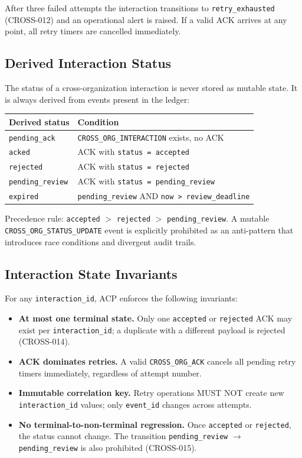 \documentclass[11pt]{article}
\theoremstyle{definition}
\begin{document}
After three failed attempts the interaction transitions to \texttt{retry\_exhausted}
(CROSS-012) and an operational alert is raised.
If a valid ACK arrives at any point, all retry timers are cancelled immediately.

\subsection{Derived Interaction Status}

The status of a cross-organization interaction is never stored as mutable state.
It is always derived from events present in the ledger:

\begin{center}
\begin{tabular}{@{}ll@{}}
\toprule
\textbf{Derived status} & \textbf{Condition} \\
\midrule
\texttt{pending\_ack} & \texttt{CROSS\_ORG\_INTERACTION} exists, no ACK \\
\texttt{acked} & ACK with \texttt{status = accepted} \\
\texttt{rejected} & ACK with \texttt{status = rejected} \\
\texttt{pending\_review} & ACK with \texttt{status = pending\_review} \\
\texttt{expired} & \texttt{pending\_review} AND \texttt{now > review\_deadline} \\
\bottomrule
\end{tabular}
\end{center}

Precedence rule: \texttt{accepted} $>$ \texttt{rejected} $>$ \texttt{pending\_review}.
A mutable \texttt{CROSS\_ORG\_STATUS\_UPDATE} event is explicitly prohibited
as an anti-pattern that introduces race conditions and divergent audit trails.

\subsection{Interaction State Invariants}

For any \texttt{interaction\_id}, ACP enforces the following invariants:

\begin{itemize}[noitemsep]
  \item \textbf{At most one terminal state.}
        Only one \texttt{accepted} or \texttt{rejected} ACK may exist per \texttt{interaction\_id};
        a duplicate with a different payload is rejected (CROSS-014).
  \item \textbf{ACK dominates retries.}
        A valid \texttt{CROSS\_ORG\_ACK} cancels all pending retry timers immediately,
        regardless of attempt number.
  \item \textbf{Immutable correlation key.}
        Retry operations MUST NOT create new \texttt{interaction\_id} values;
        only \texttt{event\_id} changes across attempts.
  \item \textbf{No terminal-to-non-terminal regression.}
        Once \texttt{accepted} or \texttt{rejected}, the status cannot change.
        The transition \texttt{pending\_review} $\to$ \texttt{pending\_review} is also prohibited (CROSS-015).
\end{itemize}
\end{document}

